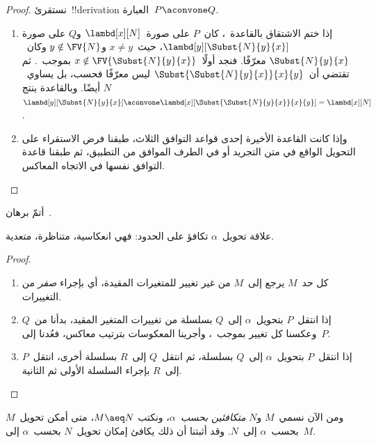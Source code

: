 \documentclass[../../../include/open-logic-section]{subfiles}
\begin{document}
\begin{proof}
  نستقرئ~!!{derivation} العبارة~$P \aconvone Q$.
  \begin{enumerate}
  \item إذا ختم الاشتقاق بالقاعدة~، كان~$P$ على
    صورة~$\lambd[x][N]$ و$Q$ على صورة
    $\lambd[y][\Subst{N}{y}{x}]$، حيث~$x \neq y$ و$y \notin \FV{N}$
    وكان~$\Subst{N}{y}{x}$ معرّفًا. فنجد أولًا~$x \notin
    \FV{\Subst{N}{y}{x}}$ بموجب~.
    ثم تقتضي  أن~$\Subst{\Subst{N}{y}{x}}{x}{y}$
    ليس معرّفًا فحسب، بل يساوي~$N$ أيضًا. وبالقاعدة
     ينتج~$\lambd[y][\Subst{N}{y}{x}]
    \aconvone \lambd[x][\Subst{\Subst{N}{y}{x}}{x}{y}] =
    \lambd[x][N]$.
  \item وإذا كانت القاعدة الأخيرة إحدى قواعد التوافق الثلاث، طبقنا فرض
    الاستقراء على التحويل الواقع في متن التجريد أو في الطرف الموافق من
    التطبيق، ثم طبقنا قاعدة التوافق نفسها في الاتجاه المعاكس.
  \end{enumerate}
\end{proof}

\begin{prob}
  أتمّ برهان~.
\end{prob}

\begin{thm}
  علاقة تحويل~$\alpha$ تكافؤ على الحدود: فهي انعكاسية، متناظرة، متعدية.
\end{thm}

\begin{proof}
  \begin{enumerate}
  \item كل حد~$M$ يرجع إلى~$M$ من غير تغيير للمتغيرات المقيدة،
    أي بإجراء \emph{صفر} من التغييرات.
  \item إذا انتقل~$P$ بتحويل~$\alpha$ إلى~$Q$ بسلسلة من تغييرات المتغير المقيد،
    بدأنا من~$Q$ وعكسنا كل تغيير بموجب~،
    وأجرينا المعكوسات بترتيب معاكس، فعُدنا إلى~$P$.
  \item إذا انتقل~$P$ بتحويل~$\alpha$ إلى~$Q$ بسلسلة،
    ثم انتقل~$Q$ إلى~$R$ بسلسلة أخرى،
    انتقل~$P$ إلى~$R$ بإجراء السلسلة الأولى ثم الثانية.
  \end{enumerate}
\end{proof}

ومن الآن نسمي~$M$ و$N$ \emph{متكافئين بحسب~$\alpha$}، ونكتب
$M \aeq N$، متى أمكن تحويل~$M$ بحسب~$\alpha$ إلى~$N$.
وقد أثبتنا أن ذلك يكافئ إمكان تحويل~$N$ بحسب~$\alpha$ إلى~$M$.
\end{document}
